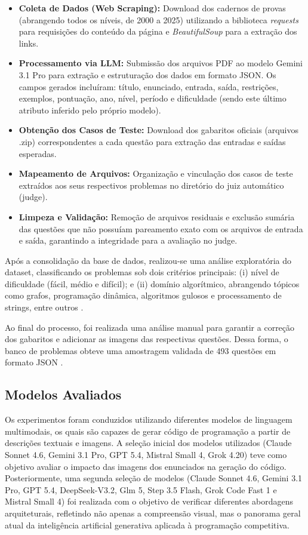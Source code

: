 \documentclass[12pt]{article}
\begin{document}
\begin{itemize}
    \item \textbf{Coleta de Dados (Web Scraping):} Download dos cadernos de provas (abrangendo todos os níveis, de 2000 a 2025) utilizando a biblioteca \textit{requests} para requisições do conteúdo da página e \textit{BeautifulSoup} para a extração dos links.
    \item \textbf{Processamento via LLM:} Submissão dos arquivos PDF ao modelo Gemini 3.1 Pro para extração e estruturação dos dados em formato JSON. Os campos gerados incluíram: título, enunciado, entrada, saída, restrições, exemplos, pontuação, ano, nível, período e dificuldade (sendo este último atributo inferido pelo próprio modelo).
    \item \textbf{Obtenção dos Casos de Teste:} Download dos gabaritos oficiais (arquivos .zip) correspondentes a cada questão para extração das entradas e saídas esperadas.
    \item \textbf{Mapeamento de Arquivos:} Organização e vinculação dos casos de teste extraídos aos seus respectivos problemas no diretório do juiz automático (judge).
    \item \textbf{Limpeza e Validação:} Remoção de arquivos residuais e exclusão sumária das questões que não possuíam pareamento exato com os arquivos de entrada e saída, garantindo a integridade para a avaliação no judge.
\end{itemize}

Após a consolidação da base de dados, realizou-se uma análise exploratória do dataset, classificando os problemas sob dois critérios principais: (i) nível de dificuldade (fácil, médio e difícil); e (ii) domínio algorítmico, abrangendo tópicos como grafos, programação dinâmica, algoritmos gulosos e processamento de strings, entre outros \cite{obi2026}.

Ao final do processo, foi realizada uma análise manual para garantir a correção dos gabaritos e adicionar as imagens das respectivas questões. Dessa forma, o banco de problemas obteve uma amostragem validada de 493 questões em formato JSON \cite{anonimo2026}.

\subsection{Modelos Avaliados}

Os experimentos foram conduzidos utilizando diferentes modelos de linguagem multimodais, os quais são capazes de gerar código de programação a partir de descrições textuais e imagens. A seleção inicial dos modelos utilizados (Claude Sonnet 4.6, Gemini 3.1 Pro, GPT 5.4, Mistral Small 4, Grok 4.20) teve como objetivo avaliar o impacto das imagens dos enunciados na geração do código. Posteriormente, uma segunda seleção de modelos (Claude Sonnet 4.6, Gemini 3.1 Pro, GPT 5.4, DeepSeek-V3.2, Glm 5, Step 3.5 Flash, Grok Code Fast 1 e Mistral Small 4) foi realizada com o objetivo de verificar diferentes abordagens arquiteturais, refletindo não apenas a compreensão visual, mas o panorama geral atual da inteligência artificial generativa aplicada à programação competitiva.
\end{document}
